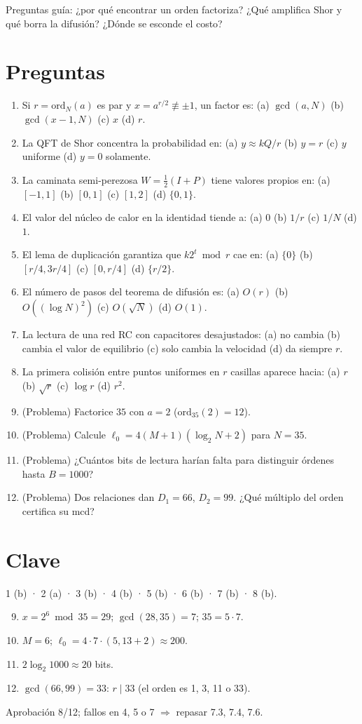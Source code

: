 \documentclass[11pt,a4paper]{article}
\begin{document}
\noindent Preguntas guía: ¿por qué encontrar un orden factoriza? ¿Qué amplifica Shor y qué borra la difusión? ¿Dónde se esconde el costo?
\section*{Preguntas}
\begin{enumerate}
\item Si $r=\mathrm{ord}_N(a)$ es par y $x=a^{r/2}\not\equiv\pm1$, un factor es: (a) $\gcd(a,N)$ (b) $\gcd(x-1,N)$ (c) $x$ (d) $r$.
\item La QFT de Shor concentra la probabilidad en: (a) $y\approx kQ/r$ (b) $y=r$ (c) $y$ uniforme (d) $y=0$ solamente.
\item La caminata semi-perezosa $W=\tfrac12(I+P)$ tiene valores propios en: (a) $[-1,1]$ (b) $[0,1]$ (c) $[1,2]$ (d) $\{0,1\}$.
\item El valor del núcleo de calor en la identidad tiende a: (a) $0$ (b) $1/r$ (c) $1/N$ (d) $1$.
\item El lema de duplicación garantiza que $k2^t\bmod r$ cae en: (a) $\{0\}$ (b) $[r/4,3r/4]$ (c) $[0,r/4]$ (d) $\{r/2\}$.
\item El número de pasos del teorema de difusión es: (a) $O(r)$ (b) $O((\log N)^2)$ (c) $O(\sqrt N)$ (d) $O(1)$.
\item La lectura de una red RC con capacitores desajustados: (a) no cambia (b) cambia el valor de equilibrio (c) solo cambia la velocidad (d) da siempre $r$.
\item La primera colisión entre puntos uniformes en $r$ casillas aparece hacia: (a) $r$ (b) $\sqrt r$ (c) $\log r$ (d) $r^2$.
\item (Problema) Factorice $35$ con $a=2$ ($\mathrm{ord}_{35}(2)=12$).
\item (Problema) Calcule $\ell_0=4(M+1)(\log_2N+2)$ para $N=35$.
\item (Problema) ¿Cuántos bits de lectura harían falta para distinguir órdenes hasta $B=1000$?
\item (Problema) Dos relaciones dan $D_1=66$, $D_2=99$. ¿Qué múltiplo del orden certifica su mcd?
\end{enumerate}
\newpage
\section*{Clave}
1 (b) · 2 (a) · 3 (b) · 4 (b) · 5 (b) · 6 (b) · 7 (b) · 8 (b).
\begin{enumerate}\setcounter{enumi}{8}
\item $x=2^6\bmod35=29$; $\gcd(28,35)=7$; $35=5\cdot7$.
\item $M=6$; $\ell_0=4\cdot7\cdot(5{,}13+2)\approx200$.
\item $2\log_2 1000\approx20$ bits.
\item $\gcd(66,99)=33$: $r\mid33$ (el orden es 1, 3, 11 o 33).
\end{enumerate}
Aprobación 8/12; fallos en 4, 5 o 7 $\Rightarrow$ repasar 7.3, 7.4, 7.6.
\end{document}
